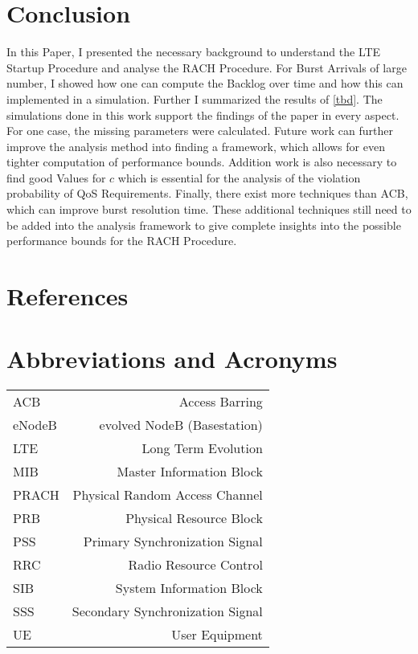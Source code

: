 \documentclass[conference]{IEEEtran}
\begin{document}
\section{Conclusion}
In this Paper, I presented the necessary background to understand the LTE Startup Procedure and analyse the RACH Procedure.
For Burst Arrivals of large number, I showed how one can compute the Backlog over time and how this can implemented in a simulation.
Further I summarized the results of \ref{tbd}.
The simulations done in this work support the findings of the paper in every aspect.
For one case, the missing parameters were calculated.
Future work can further improve the analysis method into finding a framework, which allows for even tighter computation of performance bounds.
Addition work is also necessary to find good Values for $c$ which is essential for the analysis of the violation probability of QoS Requirements.
Finally, there exist more techniques than ACB, which can improve burst resolution time.
These additional techniques still need to be added into the analysis framework to give complete insights into the possible performance bounds for the RACH Procedure.
\section*{References}


\section*{Abbreviations and Acronyms}
    \begin{tabular}{l r}
        ACB & Access Barring\\
        eNodeB & evolved NodeB (Basestation)\\
        LTE & Long Term Evolution\\
        MIB & Master Information Block\\
        PRACH & Physical Random Access Channel\\
        PRB & Physical Resource Block\\
        PSS & Primary Synchronization Signal\\
        RRC & Radio Resource Control\\
        SIB & System Information Block\\
        SSS & Secondary Synchronization Signal\\
        UE & User Equipment\\
    \end{tabular}
%
%
\end{document}

